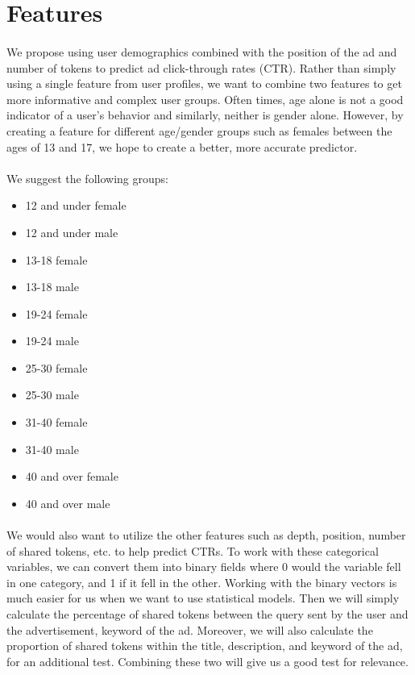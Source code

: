\documentclass[11pt]{article}
\begin{document}
\maketitle

\section*{Features}
\paragraph{}
We propose using user demographics combined with the position of the ad and number of tokens to predict ad click-through rates (CTR). Rather than simply using a single feature from user profiles, we want to combine two features to get more informative and complex user groups. Often times, age alone is not a good indicator of a user's behavior and similarly, neither is gender alone. However, by creating a feature for different age/gender groups such as females between the ages of 13 and 17, we hope to create a better, more accurate predictor. \\

\paragraph{}
We suggest the following groups:
\begin{multicols}{3}
\begin{itemize}
\item 12 and under female
\item 12 and under male
\item 13-18 female
\item 13-18 male
\item 19-24 female
\item 19-24 male
\item 25-30 female
\item 25-30 male
\item 31-40 female
\item 31-40 male
\item 40 and over female
\item 40 and over male
\end{itemize}
\end{multicols}

\paragraph{}
We would also want to utilize the other features such as depth, position, number of shared tokens, etc. to help predict CTRs. To work with these categorical variables, we can convert them into binary fields where 0 would the variable fell in one category, and 1 if it fell in the other. Working with the binary vectors is much easier for us when we want to use statistical models. Then we will simply calculate the percentage of shared tokens between the query sent by the user and the advertisement, keyword of the ad. Moreover, we will also calculate the proportion of shared tokens within the title, description, and keyword of the ad, for an additional test. Combining these two will give us a good test for relevance.
\end{document}

